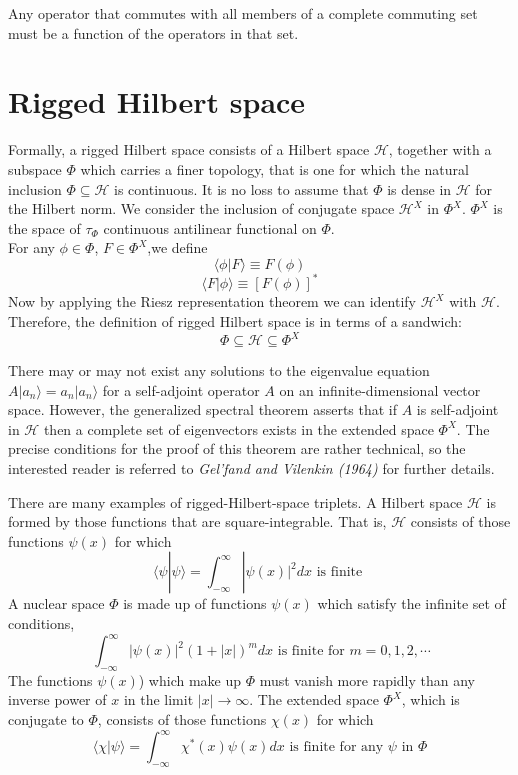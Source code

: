 \documentclass[cyan]{elegantnote}
\begin{document}
\begin{newthem}
Any operator that commutes with all members of a complete commuting set must be a function of the operators in that set.
\end{newthem}

\section{Rigged Hilbert space}
\begin{newdef}
Formally, a rigged Hilbert space consists of a Hilbert space $\mathcal{H}$, together with a subspace $\Phi$ which carries a finer topology, that is one for which the natural inclusion $\Phi \subseteq \mathcal{H}$ is continuous. 
It is no loss to assume that $\Phi$ is dense in $\mathcal{H}$ for the Hilbert norm. We consider the inclusion of conjugate space $\mathcal{H}^X$ in $\Phi^X$. $\Phi^X$ is the space of $\tau_{\Phi}$ continuous antilinear functional on $\Phi$.\\
For any $\phi \in \Phi$, $F \in \Phi^X$,we define
\[\langle \phi | F \rangle \equiv F(\phi)\]
\[\langle F | \phi \rangle \equiv [F(\phi)]^*\]
Now by applying the Riesz representation theorem we can identify $\mathcal{H}^X$ with $\mathcal{H}$. Therefore, the definition of rigged Hilbert space is in terms of a sandwich:
\[\Phi \subseteq \mathcal{H} \subseteq \Phi^X\]
\end{newdef}
There may or may not exist any solutions to the eigenvalue equation $A|a_n\rangle = a_n |a_n\rangle$ for a self-adjoint operator $A$ on an infinite-dimensional vector space. However, the generalized spectral theorem asserts that if $A$ is self-adjoint in $\mathcal{H}$ then a complete set of eigenvectors exists in the extended space $\Phi^X$. The precise conditions for the proof of this theorem are rather technical, so the interested reader is referred to \emph{Gel'fand and Vilenkin (1964)} for further details.

There are many examples of rigged-Hilbert-space triplets. A Hilbert space $\mathcal{H}$ is formed by those functions that are square-integrable. That is, $\mathcal{H}$ consists of those functions $\psi(x)$ for which
\[\langle \psi | \psi \rangle = \int_{-\infty}^{\infty} |\psi(x)|^2 dx \mbox{ is finite }\]
A nuclear space $\Phi$ is made up of functions $\psi(x)$ which satisfy the infinite set of conditions,
\[\ \int_{-\infty}^{\infty} |\psi(x)|^2(1+|x|)^m dx \mbox{ is finite for } m = 0,1,2,\cdots\]
The functions $\psi(x)$) which make up $\Phi$ must vanish more rapidly than any inverse power of $x$ in the limit $|x| \to \infty$. The extended space $\Phi^X$, which is conjugate to $\Phi$, consists of those functions $\chi(x)$ for which
\[\langle \chi | \psi \rangle = \int_{-\infty}^{\infty} \chi^*(x)\psi(x) dx \mbox{ is finite for any } \psi \mbox{ in } \Phi\]
\end{document}
